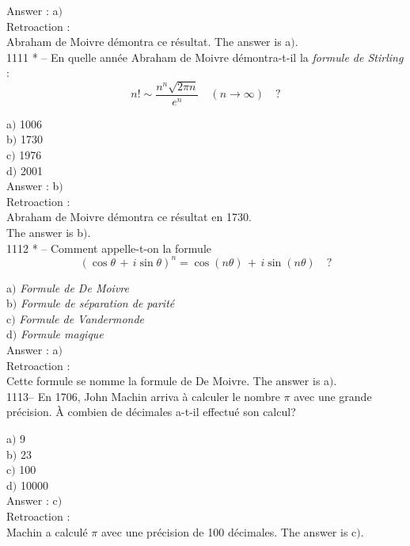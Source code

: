 ﻿\documentclass[letterpaper, 12pt]{article}
\begin{document}
Answer : a$)$\\

Retroaction :\\
Abraham de Moivre d\'emontra ce r\'esultat.
The answer is a$)$.\\

1111 * -- En quelle ann\'ee Abraham de Moivre d\'emontra-t-il la
{\sl formule de Stirling} :
$$\displaystyle{n!\sim\frac{n^n\sqrt{2\pi n}}{e^n}\quad(n\to\infty)}\quad?$$

a$)$ 1006  \\
b$)$ 1730 \\
c$)$ 1976  \\
d$)$ 2001\\

Answer : b$)$\\

Retroaction :\\
Abraham de Moivre d\'emontra ce r\'esultat en 1730. \\
The answer is b$)$.\\

1112 * -- Comment appelle-t-on la formule
$$(\cos\theta\,+\,i\sin\theta)^n=\cos(n\theta)\,+\,i\sin(n\theta)\quad?$$


a$)$ {\sl Formule de De Moivre} \\
b$)$ {\sl Formule de s\'eparation de parit\'e}  \\
c$)$ {\sl Formule de Vandermonde}  \\
d$)$ {\sl Formule magique}\\

Answer : a$)$\\

Retroaction :\\
Cette formule se nomme la formule de De Moivre.
The answer is a$)$.\\

1113-- En 1706, John Machin arriva \`a calculer le nombre $\pi$ avec
une grande pr\'ecision. \`A combien de d\'ecimales a-t-il effectu\'e
son calcul?

a$)$ 9  \\
b$)$ 23 \\
c$)$ 100  \\
d$)$ 10000 \\

Answer : c$)$\\

Retroaction :\\
Machin a calcul\'e $\pi$ avec une pr\'ecision de 100 d\'ecimales.
The answer is c$)$.\\
\end{document}
